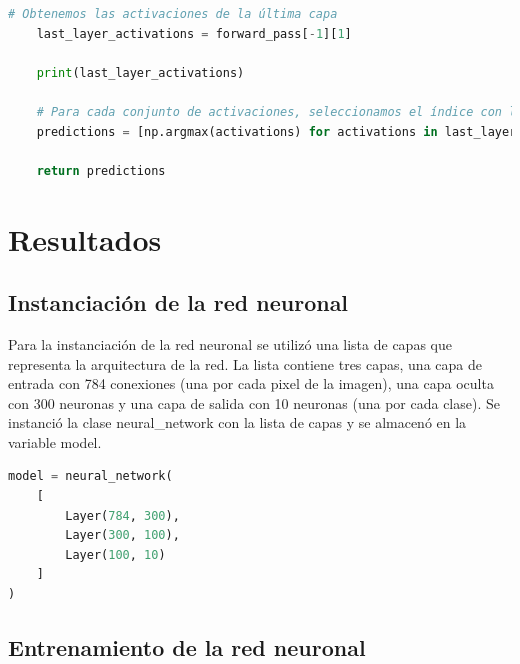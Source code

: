 \documentclass{article}
\begin{document}
\begin{itemize}
\begin{lstlisting}[language=Python, caption={Predicción de la red neuronal}, label={lst:predict_network}]
    # Obtenemos las activaciones de la última capa
    last_layer_activations = forward_pass[-1][1]

    print(last_layer_activations)

    # Para cada conjunto de activaciones, seleccionamos el índice con la mayor activación
    predictions = [np.argmax(activations) for activations in last_layer_activations]

    return predictions
        \end{lstlisting}
    \end{itemize}


    \section{Resultados}\label{sec:resultados}

    \subsection{Instanciación de la red neuronal}\label{subsec:instanciacion-de-la-red-neuronal}

    Para la instanciación de la red neuronal se utilizó una lista de capas que representa la arquitectura de la red.
    La lista contiene tres capas, una capa de entrada con 784 conexiones (una por cada pixel de la imagen),
    una capa oculta con 300 neuronas y una capa de salida con 10 neuronas (una por cada clase).
    Se instanció la clase neural\_network con la lista de capas y se almacenó en la variable model.
    \begin{lstlisting}[language=Python, caption={Instanciación de la red neuronal}, label={lst:instanciacion_red_neuronal}]
model = neural_network(
    [
        Layer(784, 300),
        Layer(300, 100),
        Layer(100, 10)
    ]
)
    \end{lstlisting}

    \subsection{Entrenamiento de la red neuronal}\label{subsec:entrenamiento-de-la-red-neuronal}
\end{document}
